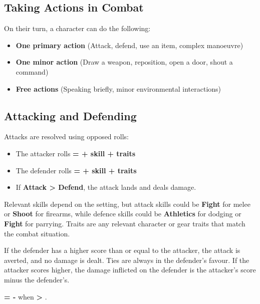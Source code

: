 \subsection{Taking Actions in Combat}

On their turn, a character can do the following:
\begin{itemize}
    \item \textbf{One primary action} (Attack, defend, use an item, complex manoeuvre)
    \item \textbf{One minor action} (Draw a weapon, reposition, open a door, shout a command)
    \item \textbf{Free actions} (Speaking briefly, minor environmental interactions)
\end{itemize}

\subsection{Attacking and Defending}

Attacks are resolved using opposed rolls:
\begin{Example}
	\begin{itemize}
    	\item The attacker rolls \textbf{\Attack = \FudgeRoll + skill + traits}
	    \item The defender rolls \textbf{\Defend = \FudgeRoll + skill + traits} 	    
	    \item If \textbf{Attack > Defend}, the attack lands and deals damage.
	\end{itemize}
\end{Example}

Relevant skills depend on the setting, but attack skills could be \textbf{Fight} for melee or \textbf{Shoot} for firearms, while defence skills could be \textbf{Athletics} for dodging or \textbf{Fight} for parrying. Traits are any relevant character or gear traits that match the combat situation.

If the defender has a higher score than or equal to the attacker, the attack is averted, and no damage is dealt. Ties are always in the defender's favour. If the attacker scores higher, the damage inflicted on the defender is the attacker's score minus the defender's.

\begin{Example}
    \textbf{\Damage = \Attack - \Defend} when \textbf{\Attack > \Defend}.
\end{Example}

